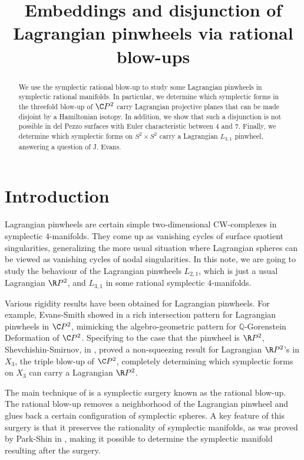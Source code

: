 
\title{Embeddings and disjunction of Lagrangian pinwheels via rational blow-ups}
\maketitle

\begin{abstract}
We use the symplectic rational blow-up to study some Lagrangian pinwheels in symplectic rational manifolds. In particular, we determine which symplectic forms in the threefold blow-up of $\C P^2$ carry Lagrangian projective planes that can be made disjoint by a Hamiltonian isotopy. In addition, we show that such a disjunction is not possible in del Pezzo surfaces with Euler characteristic between $4$ and $7$. Finally, we determine which symplectic forms on $S^2\times S^2$ carry a Lagrangian $L_{3,1}$ pinwheel, answering a question of J. Evans.
\end{abstract}



\section*{Introduction}
Lagrangian pinwheels are certain simple two-dimensional CW-complexes in symplectic $4$-manifolds. They come up as vanishing cycles of surface quotient singularities, generalizing the more usual situation where Lagrangian spheres can be viewed as vanishing cycles of nodal singularities. In this note, we are going to study the behaviour of the Lagrangian pinwheels  $L_{2,1}$, which is just a usual Lagrangian $\R P^2$, and $L_{3,1}$ in some rational symplectic $4$-manifolds.\par 

Various rigidity results have been obtained for Lagrangian pinwheels. For example, Evans-Smith showed in \cite{ES} a rich intersection pattern for Lagrangian pinwheels in $\C P^2$, mimicking the algebro-geometric pattern for $\mathbb{Q}$-Gorenstein Deformation of $\C P^2$. Specifying to the case that the pinwheel is $\R P^2$, Shevchishin-Smirnov, in \cite{SS}, proved a non-squeezing result for Lagrangian $\R P^2$'s in $X_3$, the triple blow-up of $\C P^2$, completely determining which symplectic forms on $X_3$ can carry a Lagrangian $\R P^2$.\par 

The main technique of \cite{SS} is a symplectic surgery known as the rational blow-up. The rational blow-up removes a neighborhood of the Lagrangian pinwheel and glues back a certain configuration of symplectic spheres. A key feature of this surgery is that it preserves the rationality of symplectic manifolds, as was proved by Park-Shin in \cite{ParkShin}, making it possible to determine the symplectic manifold resulting after the surgery.\par

